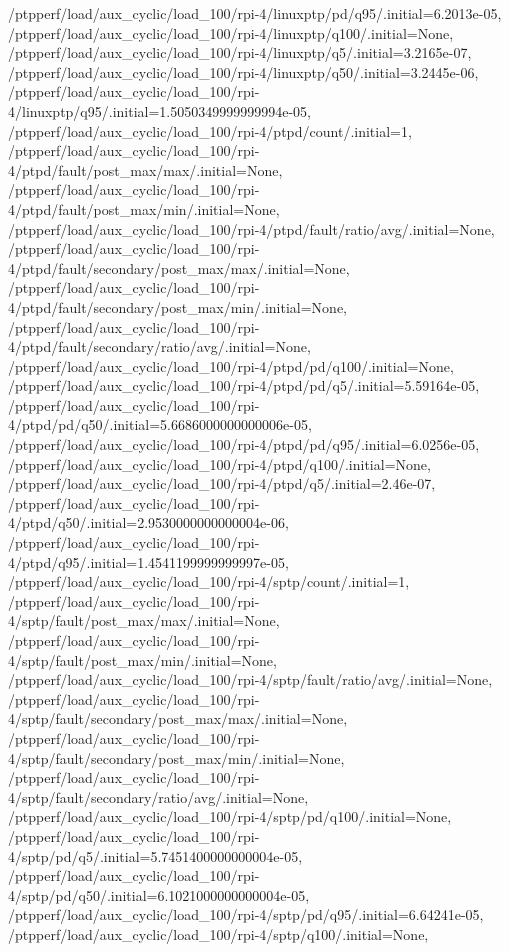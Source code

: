 {    /ptpperf/load/aux_cyclic/load_100/rpi-4/linuxptp/pd/q95/.initial=6.2013e-05,
    /ptpperf/load/aux_cyclic/load_100/rpi-4/linuxptp/q100/.initial=None,
    /ptpperf/load/aux_cyclic/load_100/rpi-4/linuxptp/q5/.initial=3.2165e-07,
    /ptpperf/load/aux_cyclic/load_100/rpi-4/linuxptp/q50/.initial=3.2445e-06,
    /ptpperf/load/aux_cyclic/load_100/rpi-4/linuxptp/q95/.initial=1.5050349999999994e-05,
    /ptpperf/load/aux_cyclic/load_100/rpi-4/ptpd/count/.initial=1,
    /ptpperf/load/aux_cyclic/load_100/rpi-4/ptpd/fault/post_max/max/.initial=None,
    /ptpperf/load/aux_cyclic/load_100/rpi-4/ptpd/fault/post_max/min/.initial=None,
    /ptpperf/load/aux_cyclic/load_100/rpi-4/ptpd/fault/ratio/avg/.initial=None,
    /ptpperf/load/aux_cyclic/load_100/rpi-4/ptpd/fault/secondary/post_max/max/.initial=None,
    /ptpperf/load/aux_cyclic/load_100/rpi-4/ptpd/fault/secondary/post_max/min/.initial=None,
    /ptpperf/load/aux_cyclic/load_100/rpi-4/ptpd/fault/secondary/ratio/avg/.initial=None,
    /ptpperf/load/aux_cyclic/load_100/rpi-4/ptpd/pd/q100/.initial=None,
    /ptpperf/load/aux_cyclic/load_100/rpi-4/ptpd/pd/q5/.initial=5.59164e-05,
    /ptpperf/load/aux_cyclic/load_100/rpi-4/ptpd/pd/q50/.initial=5.6686000000000006e-05,
    /ptpperf/load/aux_cyclic/load_100/rpi-4/ptpd/pd/q95/.initial=6.0256e-05,
    /ptpperf/load/aux_cyclic/load_100/rpi-4/ptpd/q100/.initial=None,
    /ptpperf/load/aux_cyclic/load_100/rpi-4/ptpd/q5/.initial=2.46e-07,
    /ptpperf/load/aux_cyclic/load_100/rpi-4/ptpd/q50/.initial=2.9530000000000004e-06,
    /ptpperf/load/aux_cyclic/load_100/rpi-4/ptpd/q95/.initial=1.4541199999999997e-05,
    /ptpperf/load/aux_cyclic/load_100/rpi-4/sptp/count/.initial=1,
    /ptpperf/load/aux_cyclic/load_100/rpi-4/sptp/fault/post_max/max/.initial=None,
    /ptpperf/load/aux_cyclic/load_100/rpi-4/sptp/fault/post_max/min/.initial=None,
    /ptpperf/load/aux_cyclic/load_100/rpi-4/sptp/fault/ratio/avg/.initial=None,
    /ptpperf/load/aux_cyclic/load_100/rpi-4/sptp/fault/secondary/post_max/max/.initial=None,
    /ptpperf/load/aux_cyclic/load_100/rpi-4/sptp/fault/secondary/post_max/min/.initial=None,
    /ptpperf/load/aux_cyclic/load_100/rpi-4/sptp/fault/secondary/ratio/avg/.initial=None,
    /ptpperf/load/aux_cyclic/load_100/rpi-4/sptp/pd/q100/.initial=None,
    /ptpperf/load/aux_cyclic/load_100/rpi-4/sptp/pd/q5/.initial=5.7451400000000004e-05,
    /ptpperf/load/aux_cyclic/load_100/rpi-4/sptp/pd/q50/.initial=6.1021000000000004e-05,
    /ptpperf/load/aux_cyclic/load_100/rpi-4/sptp/pd/q95/.initial=6.64241e-05,
    /ptpperf/load/aux_cyclic/load_100/rpi-4/sptp/q100/.initial=None,
}
